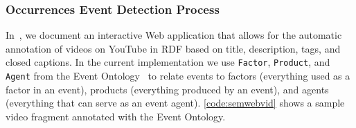\documentclass[runningheads,a4paper]{llncs}
\begin{document}

\subsubsection{Occurrences Event Detection Process}
In~\cite{semwebvid}, we document an interactive Web application that allows for the automatic annotation of videos on YouTube in RDF based on title, description, tags, and closed captions. In the current implementation we use \texttt{Factor}, \texttt{Product}, and \texttt{Agent} from the Event Ontology~\cite{Raimond:Event} to relate events to factors (everything used as a factor in an event), products (everything produced by an event), and agents (everything that can serve as an event agent). \autoref{code:semwebvid} shows a sample video fragment annotated with the Event Ontology.
\end{document}
